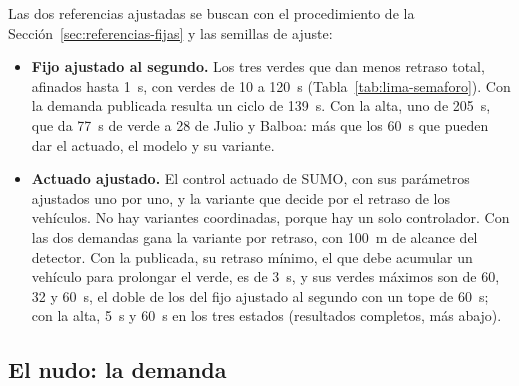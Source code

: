 Las dos referencias ajustadas se buscan con el procedimiento de la
Sección~\ref{sec:referencias-fijas} y las semillas de ajuste:
\begin{itemize}
  \item \textbf{Fijo ajustado al segundo.} Los tres verdes que dan
    menos retraso total, afinados hasta 1~s, con verdes de 10 a 120~s
    (Tabla~\ref{tab:lima-semaforo}). Con la demanda publicada resulta un
    ciclo de 139~s. Con la alta, uno de 205~s, que da 77~s de verde a 28
    de Julio y Balboa: más que los 60~s que pueden dar el actuado, el
    modelo y su variante.
  \item \textbf{Actuado ajustado.} El control actuado de SUMO, con sus
    parámetros ajustados uno por uno, y la variante que decide por el
    retraso de los vehículos. No hay variantes coordinadas, porque hay
    un solo controlador. Con las dos demandas gana la variante por
    retraso, con 100~m de alcance del detector. Con la publicada, su
    retraso mínimo, el que debe acumular un vehículo para prolongar el
    verde, es de 3~s, y sus verdes máximos son de 60, 32 y 60~s, el doble
    de los del fijo ajustado al segundo con un tope de 60~s; con la alta,
    5~s y 60~s en los tres estados (resultados completos, más abajo).
\end{itemize}

\subsection*{El nudo: la demanda}

